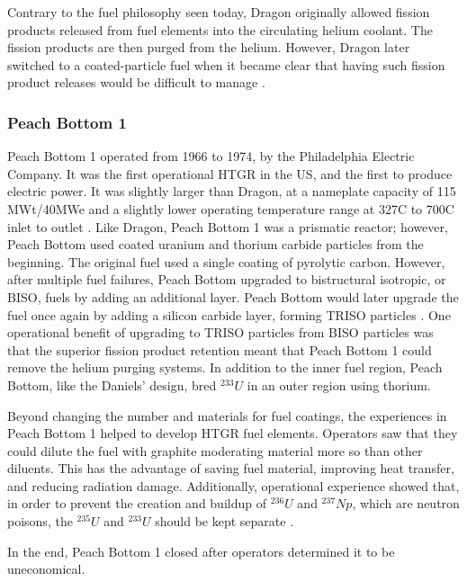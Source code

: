 Contrary to the fuel philosophy seen today, Dragon originally allowed fission products released from fuel elements into the circulating helium coolant.  The fission products are then purged from the helium.  However, Dragon later switched to a coated-particle fuel when it became clear that having such fission product releases would be difficult to manage \cite{simnad_early_1991}.

\subsubsection{Peach Bottom 1}

Peach Bottom 1 operated from 1966 to 1974, by the Philadelphia Electric Company.  It was the first operational HTGR in the US, and the first to produce electric power.  It was slightly larger than Dragon, at a nameplate capacity of 115 MWt/40MWe and a slightly lower operating temperature range at 327\textdegree  C to 700\textdegree  C inlet to outlet \cite{beck_high_nodate}.  Like Dragon, Peach Bottom 1 was a prismatic reactor; however, Peach Bottom used coated uranium and thorium carbide particles from the beginning.  The original fuel used a single coating of pyrolytic carbon.  However, after multiple fuel failures, Peach Bottom upgraded to bistructural isotropic, or BISO, fuels by adding an additional layer.  Peach Bottom would later upgrade the fuel once again by adding a silicon carbide layer, forming TRISO particles \cite{beck_high_nodate}.  One operational benefit of upgrading to TRISO particles from BISO particles was that the superior fission product retention meant that Peach Bottom 1 could remove the helium purging systems.  In addition to the inner fuel region, Peach Bottom, like the Daniels' design, bred $^{233}U$ in an outer region using thorium.

Beyond changing the number and materials for fuel coatings, the experiences in Peach Bottom 1 helped to develop HTGR fuel elements.  Operators saw that they could dilute the fuel with graphite moderating material more so than other diluents.  This has the advantage of saving fuel material, improving heat transfer, and reducing radiation damage.  Additionally, operational experience showed that, in order to prevent the creation and buildup of $^{236}U$ and $^{237}Np$, which are neutron poisons, the $^{235}U$ and $^{233}U$ should be kept separate \cite{simnad_early_1991}.

In the end, Peach Bottom 1 closed after operators determined it to be uneconomical.

